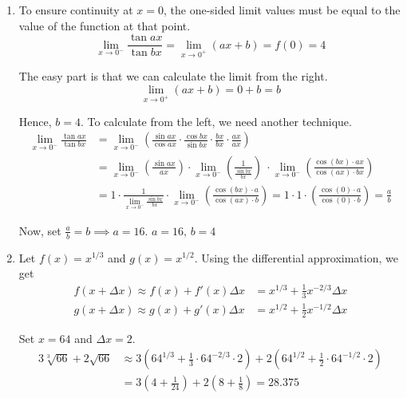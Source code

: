 \documentclass[a4paper, 12pt]{article}
\begin{document}
\begin{enumerate}[leftmargin=*,label=\textbf{\arabic*.}]
\item To ensure continuity at $x=0$, the one-sided limit values must be equal to the value of the function at that point.
\[\lim_{x\to0^-} \frac{\tan ax}{\tan bx} = \lim_{x\to0^+} (ax+b) = f(0) = 4\]

\vspace{-0.5em}
The easy part is that we can calculate the limit from the right.
\[\lim_{x\to0^+} (ax+b) = 0+b = b\]

\vspace{-0.5em}
Hence, $b=4$. To calculate from the left, we need another technique.
\begin{align*}
\lim_{x\to0^-} \frac{\tan ax}{\tan bx} &= \lim_{x\to0^-} \left(\frac{\sin ax}{\cos ax} \cdot \frac{\cos bx}{\sin bx} \cdot \frac{bx}{bx}\cdot \frac{ax}{ax}\right)\\[1em]&=\lim_{x\to0^-} \left(\frac{\sin ax}{ax} \right)\cdot \lim_{x\to0^-} \left(\frac1{ \frac{\sin bx}{bx}}\right)\ \cdot \lim_{x\to0^-} \left(\frac{\cos (bx) \cdot ax}{\cos(ax) \cdot bx}\right)\\[1em]&=1\cdot  \frac1{\displaystyle \lim_{x\to0^-} \frac{\sin bx}{bx} }\cdot \lim_{x\to0^-} \left(\frac{\cos (bx) \cdot a}{\cos(ax) \cdot b}\right)= 1\cdot 1\cdot\left(\frac{\cos(0) \cdot a}{\cos(0) \cdot b}\right)=\frac ab
\end{align*}

\vspace{-1em}
Now, set $\displaystyle \frac ab = b\implies a= 16$. $\boxed{a=16,\,b=4}$

\item Let $f(x) = x^{1/3}$ and $g(x) = x^{1/2}$. Using the differential approximation, we get
\begin{align*}
f(x+\Delta x)\approx f(x) + f'(x)\Delta x&=x^{1/3}+\frac13x^{-2/3}\Delta x\\
g(x+\Delta x)\approx g(x) + g'(x)\Delta x&=x^{1/2}+\frac12x^{-1/2}\Delta x
\end{align*}

Set $x = 64$ and $\Delta x = 2$.
\begin{align*}
3\sqrt[3]{66}+2\sqrt{66}&\approx3\left(64^{1/3}+\frac13\cdot64^{-2/3}\cdot2\right)+2\left(64^{1/2}+\frac{1}2\cdot64^{-1/2}\cdot2\right)\\[1em]&=3\left(4+\frac1{24}\right)+2\left(8+\frac18\right)=\boxed{28.375}\end{align*}


\end{enumerate}
\end{document}
